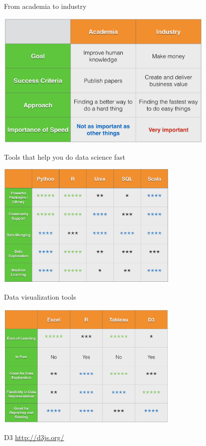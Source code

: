 \documentclass[10pt]{beamer}
\begin{document}
    \begin{frame}{From academia to industry}
      \begin{center}
        \includegraphics[width=300pt]{../graphs/academia_industry}
      \end{center}
    \end{frame}
    
    \begin{frame}{Tools that help you do data science fast}
      \begin{center}
         \includegraphics[width=250pt]{../graphs/data_tools}
      \end{center}
    \end{frame}

    \begin{frame}{Data visualization tools}
      \begin{center}
         \includegraphics[width=250pt]{../graphs/data_visualization_tools}
      \end{center}
      {\footnotesize
        D3 \url{http://d3js.org/}
      }
    \end{frame}
\end{document}
